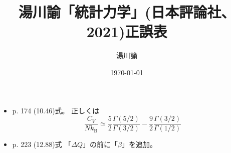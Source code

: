 \documentclass[dvipdfmx,uplatex]{jsarticle}
\begin{document}
\title{湯川諭「統計力学」(日本評論社、2021)正誤表}
\author{湯川諭}
\date{\today}
\maketitle
\begin{itemize}
\item
p. 174 (10.46)式。
正しくは
\[
 \dfrac{C_V}{N k_\mathrm{B}}\simeq
 \dfrac{5}{2} \dfrac{\Gamma(5/2)}{\Gamma(3/2)} -
 \dfrac{9}{2} \dfrac{\Gamma(3/2)}{\Gamma(1/2)}
\]
\item
p. 223 (12.88)式 「$\Delta Q$」の前に「$\beta$」を追加。
\end{itemize}
\end{document}
